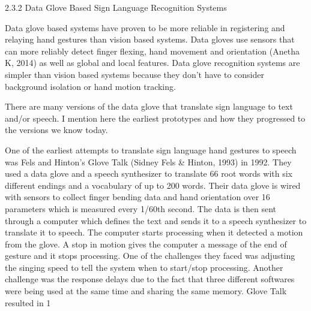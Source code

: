 2.3.2 Data Glove Based Sign Language Recognition Systems 

Data glove based systems have proven to be more reliable in registering and relaying hand gestures than vision based systems. Data gloves use sensors that can more reliably detect finger flexing, hand movement and orientation (Anetha K, 2014) as well as global and local features. Data glove recognition systems are simpler than vision based systems because they don’t have to consider background isolation or hand motion tracking. 

There are many versions of the data glove that translate sign language to text and/or speech. I mention here the earliest prototypes and how they progressed to the versions we know today. 

One of the earliest attempts to translate sign language hand gestures to speech was Fels and Hinton’s Glove Talk (Sidney Fels \& Hinton, 1993) in 1992. They used a data glove and a speech synthesizer to translate 66 root words with six different endings and a vocabulary of up to 200 words. 
Their data glove is wired with sensors to collect finger bending data and hand orientation over 16 parameters which is measured every 1/60th second. The data is then sent through a computer which defines the text and sends it to a speech synthesizer to translate it to speech. The computer starts processing when it detected a motion from the glove. A stop in motion gives the computer a message of the end of gesture and it stops processing. One of the challenges they faced was adjusting the singing speed to tell the system when to start/stop processing. Another challenge was the response delays due to the fact that three different softwares were being used at the same time and sharing the same memory. Glove Talk resulted in 1%

